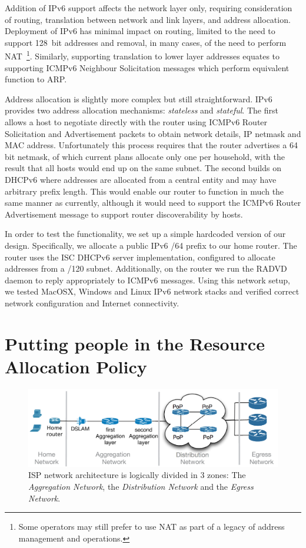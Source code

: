 Addition of IPv6 support affects the network layer only, requiring consideration
of routing, translation between network and link layers, and address
allocation.  Deployment of IPv6 has minimal impact on routing, limited to the
need to support 128~bit addresses and removal, in many cases, of the need to
perform NAT~\footnote{Some operators may still prefer to use NAT as part of a
  legacy of address management and operations.}.  Similarly, supporting
translation to lower layer addresses equates to supporting ICMPv6 Neighbour
Solicitation messages which perform equivalent function to ARP.

Address allocation is slightly more complex but still straightforward.  IPv6
provides two address allocation mechanisms: \emph{stateless} and
\emph{stateful}.  The first allows a host to negotiate directly with the router
using ICMPv6 Router Solicitation and Advertisement packets to obtain network
details, IP netmask and MAC address.  Unfortunately this process requires that
the router advertises a 64 bit netmask, of which current plans allocate only one
per household, with the result that all hosts would end up on the same subnet.
The second builds on DHCPv6 where addresses are allocated from a central entity
and may have arbitrary prefix length.  This would enable our router to function
in much the same manner as currently, although it would need to support the
ICMPv6 Router Advertisement message to support router discoverability by hosts. 

In order to test the functionality, we set up a simple hardcoded version of our
design. Specifically, we allocate a public IPv6 /64 prefix to our home router.
The router uses the ISC DHCPv6 server implementation, configured to allocate
addresses from a /120 subnet.  Additionally, on the router we run the RADVD
daemon to reply appropriately to ICMPv6 messages.  Using this network setup, we
tested MacOSX, Windows and Linux IPv6 network stacks and verified correct network
configuration and Internet connectivity. 


\section{Putting people in the Resource Allocation Policy}\label{s:qos}

\begin{figure}
  \centering
  \includegraphics[width=0.95\columnwidth]{isp_plan}
  \caption[ISP network architecture]{\label{fig:isp_plan} ISP network architecture is logically divided in 3
    zones: The {\it Aggregation Network}, the {\it Distribution Network}\/ and
    the {\it Egress Network}.}
\end{figure}


